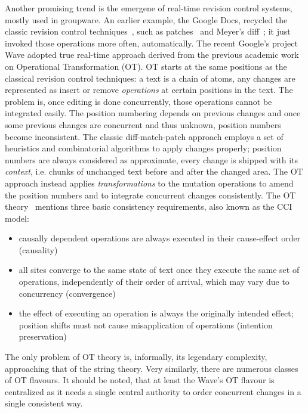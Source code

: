 \documentclass{acm_proc_article-sp}
\begin{document}
Another promising trend is the emergene of real-time
revision control systems, mostly used in groupware.
An earlier example, the Google Docs, recycled the classic revision
control techniques~\cite{diff-match-patch}, such as
patches~\cite{patch} and Meyer's diff~\cite{meyer-diff};
it just invoked those operations more often, automatically.
The recent Google's project Wave adopted true
real-time approach derived from the previous academic
work on Operational Transformation (OT).
OT starts at the same positions as the classical revision
control techniques: a text is a chain of atoms,
any changes are represented as insert or remove
\emph{operations} at certain positions in the
text. The problem is, once editing is done concurrently,
those operations cannot be integrated easily. The position
numbering depends on previous changes and once some previous
changes are concurrent and thus unknown, position numbers
become inconsistent. The classic diff-match-patch approach
employs a set of heuristics and combinatorial algorithms
to apply changes properly; position numbers are always
considered as approximate, every change is shipped with
its \emph{context}, i.e. chunks of unchanged text before
and after the changed area.
The OT approach instead applies
\emph{transformations} to the mutation operations to amend
the position numbers and to integrate concurrent
changes consistently. The OT theory~\cite{sun-achieving} mentions
three basic consistency requirements, also known as the CCI
model: 
\begin{itemize}
\item causally dependent operations are always
executed in their cause-effect order (causality)
\item all sites converge to the same state of text once
they execute the same set of operations, independently of
their order of arrival, which may vary due to concurrency (convergence)
\item the effect of executing an operation is
always the originally intended effect; position shifts must
not cause misapplication of operations (intention preservation)
\end{itemize}
The only problem of OT theory is, informally, its legendary
complexity, approaching that of the string theory.
Very similarly, there are numerous classes of OT flavours\cite{ot}.
It should be noted, that at least the Wave's OT flavour
is centralized as it needs a single
central authority to order concurrent changes in a single
consistent way.
\end{document}

